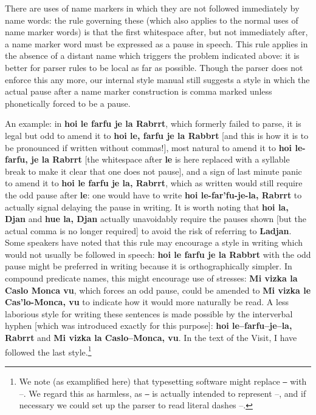 \documentclass[12pt]{book}
\begin{document}
There are uses of name markers in which they are not followed immediately by name words:  the rule governing these (which also applies to the normal uses of name marker words) is that the first whitespace after, but not immediately after, a name marker word must be  expressed as a pause in speech.  This rule applies in the absence of a distant name which triggers the problem indicated above:  it is better for parser rules to be local as far as possible.  Though the parser does not enforce this any more, our internal style manual still suggests a style in which the actual pause after a name marker construction is comma marked unless phonetically forced to be a pause.

An example:  in {\bf hoi le farfu je la Rabrrt}, which formerly failed to parse, it is legal but odd to amend it to {\bf hoi le, farfu je la Rabbrt} [and this is how it is to be pronounced if written without commas!], most natural to amend it to {\bf hoi le-farfu, je la Rabrrt} [the whitespace after {\bf le} is here replaced with a syllable break to make it clear that one does not pause], and a sign of last minute panic to amend it to {\bf hoi le farfu je la, Rabrrt}, which as written would still require the odd pause after {\bf le}:  one would have to write
{\bf hoi le-far'fu-je-la, Rabrrt} to actually signal delaying the pause in writing.  It is worth noting that {\bf hoi la, Djan} and {\bf hue la, Djan} actually unavoidably require the pauses shown [but the actual comma is no longer required] to avoid the risk of referring to {\bf Ladjan}.   Some speakers have noted that this rule may encourage a style in writing which would not usually be followed in speech:  {\bf hoi le farfu je la Rabbrt} with the odd pause might be preferred in writing because it is orthographically simpler.  In compound predicate names, this might encourage use of stresses:  {\bf Mi vizka la Caslo Monca vu}, which forces an odd pause, could be amended to {\bf Mi vizka le Cas'lo-Monca, vu} to indicate how it would more naturally be read.    A less laborious style for writing these sentences is made possible by the interverbal hyphen [which was introduced exactly for this purpose]:  {\bf hoi le--farfu--je--la, Rabrrt} and {\bf Mi vizka la Caslo--Monca, vu}.  In the text of the Visit, I have followed the last style.\footnote{We note (as examplified here) that typesetting software might replace {\tt --} with --.  We regard this as harmless, as {\tt --} is actually intended to represent --, and if necessary we could set up the parser to read literal dashes --.}
\end{document}
